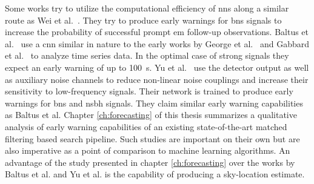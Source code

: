 Some works try to utilize the computational efficiency of \acrshort{nn}s along a similar route as Wei et al.~\cite{Wei:2020sfz}. They try to produce early warnings for \acrshort{bns} signals to increase the probability of successful prompt \acrshort{em} follow-up observations. Baltus et al.~\cite{Baltus:2021nme, Baltus:2021emh} use a \acrshort{cnn} similar in nature to the early works by George et al.~\cite{George:2016hay} and Gabbard et al.~\cite{Gabbard:2017lja} to analyze time series data. In the optimal case of strong signals they expect an early warning of up to \SI{100}{\second}. Yu et al.~\cite{Yu:2021vvm} use the detector output as well as auxiliary noise channels to reduce non-linear noise couplings and increase their sensitivity to low-frequency signals. Their network is trained to produce early warnings for \acrshort{bns} and \acrshort{nsbh} signals. They claim similar early warning capabilities as Baltus et al. Chapter \ref{ch:forecasting} of this thesis summarizes a qualitative analysis of early warning capabilities of an existing state-of-the-art matched filtering based search pipeline. Such studies are important on their own but are also imperative as a point of comparison to machine learning algorithms. An advantage of the study presented in chapter \ref{ch:forecasting} over the works by Baltus et al. and Yu et al. is the capability of producing a sky-location estimate.

